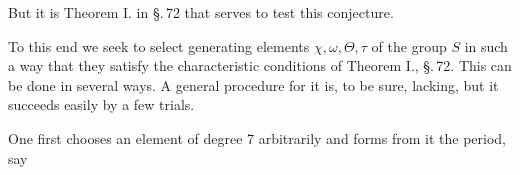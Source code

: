 But it is Theorem I. in \S.\,72 that serves to test this
conjecture.

To this end we seek to select generating elements $\chi, \omega, \Theta, \tau$
of the group $S$ in such a way that they satisfy the characteristic
conditions of Theorem I., \S.\,72. This can be done in
several ways. A general procedure for it is, to be sure, lacking,
but it succeeds easily by a few trials.

One first chooses an element of degree 7 arbitrarily
and forms from it the period, say
